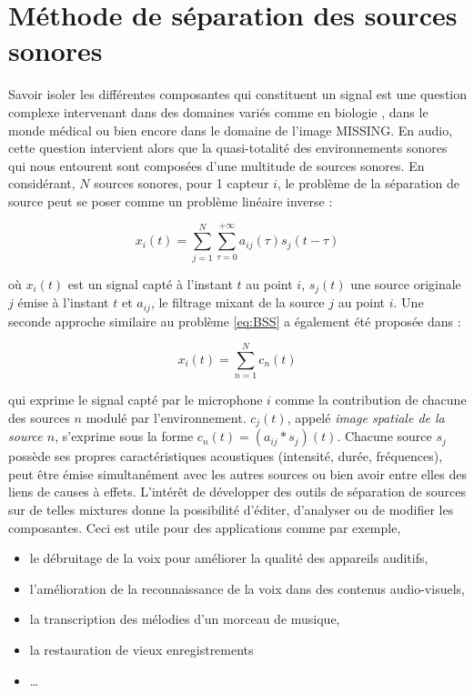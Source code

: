%
%
%
%
%

\chapter{Méthode de séparation des sources sonores}


Savoir isoler les différentes composantes qui constituent un signal est une question complexe intervenant dans des domaines variés comme en biologie \cite{chiappetta2004blind}, dans le monde médical \cite{jung2000removing} ou bien encore dans le domaine de l'image \cite{} MISSING. En audio, cette question intervient alors que la quasi-totalité des environnements sonores qui nous entourent sont composées d'une multitude de sources sonores. En considérant, $N$ sources sonores, pour 1 capteur $i$, le problème de la séparation de source peut se poser comme un problème linéaire inverse :

\begin{equation}\label{eq:BSS}
x_i(t) = \sum_{j = 1}^{N}\sum_{\tau = 0}^{+\infty} a_{ij}(\tau)s_j(t-\tau)
\end{equation}

où $x_i(t)$ est un signal capté à l'instant $t$ au point $i$, $s_j(t)$ une source originale $j$ émise à l'instant $t$ et $a_{ij}$, le filtrage mixant de la source $j$ au point $i$. Une seconde approche similaire au problème \ref{eq:BSS} a également été proposée dans \cite{cardoso_blind_1998} :

\begin{equation}
x_i(t) = \sum_{n = 1}^{N}c_n(t)
\end{equation}

qui exprime le signal capté par le microphone $i$ comme la contribution de chacune des sources $n$ modulé par l'environnement. $c_j(t)$, appelé \textit{image spatiale de la source $n$}, s'exprime sous la forme $c_n(t) = (a_{ij} \ast s_j)(t)$.
Chacune source $s_j$ possède ses propres caractéristiques acoustiques (intensité, durée, fréquences), peut être émise simultanément avec les autres sources ou bien avoir entre elles des liens de causes à effets.
L'intérêt de développer des outils de séparation de sources sur de telles mixtures donne la possibilité d'éditer, d'analyser ou de modifier les composantes. Ceci est utile pour des applications comme par exemple,

\begin{itemize}
\item le débruitage de la voix pour améliorer la qualité des appareils auditifs,
\item l'amélioration de la reconnaissance de la voix dans des contenus audio-visuels,
\item la transcription des mélodies d'un morceau de musique,
\item la restauration de vieux enregistrements
\item \dots
\end{itemize}

